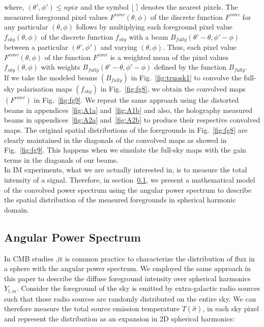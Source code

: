 \documentclass[fleqn,usenatbib]{mnras}
\begin{document}
\noindent where,  $ (\theta', \phi') \leq npix$ and the symbol $\lfloor \, \rceil$ denotes the nearest pixels. The measured foreground pixel values $ F^{conv}(\theta, \phi)$ of the discrete function $ F^{conv}$ for any particular $ (\theta, \phi)$ follows by multiplying each foreground pixel value $f_{sky}(\theta, \phi)$ of the discrete function $f_{sky}$ with a beam  $B_{fully}(\theta' - \theta, \phi' - \phi)$ between a particular $ (\theta', \phi')$ and varying $(\theta, \phi)$. Thus, each pixel value $ F^{conv}(\theta, \phi)$ of the function $ F^{conv}$ is a weighted mean of the pixel values $f_{sky}(\theta, \phi)$ with weights $B_{fully}(\theta' - \theta, \phi' - \phi)$ defined by the function $B_{fully}$.\\

\noindent
If we take the modeled beams $(B_{fully})$ in Fig.~\ref{fig:truosk1} to convolve the full-sky polarisation maps $(f_{sky})$ in Fig.~\ref{fig:fg8}, we obtain the convolved maps  $(F^{conv})$ in Fig.~\ref{fig:fg9}. We repeat the same approach using the distorted beams in appendices~\ref{fig:A1a} and~\ref{fig:A1b} and also, the holography measured beams in appendices~\ref{fig:A2a} and~\ref{fig:A2b} to produce their respective convolved maps. The original spatial distributions of the foregrounds in Fig.~\ref{fig:fg8} are clearly maintained in the diagonals of the convolved maps as showed in Fig.~\ref{fig:fg9}. This happens when we simulate the full-sky maps with the gain terms in the diagonals of our beams.\\

\noindent
In IM experiments, what we are actually interested in, is to measure the total intensity of a signal. Therefore, in section~\ref{sec:spectrum}, we present a mathematical model of the convolved power spectrum using the angular power spectrum to describe the spatial distribution of the measured foregrounds in spherical harmonic domain.


\subsection{Angular Power Spectrum}    \label{sec:spectrum}
In CMB studies \citep{2006NewAR..50..854S,2015arXiv151100532K,1998PhRvD..57.5273W,2015aska.confE..35W,2006ApJ...645L..89S,2016MNRAS.457.1796A},it is common practice to characterize the distribution of flux in a sphere with the angular power spectrum. We employed the same approach in this paper to describe the diffuse foreground intensity over spherical harmonics $Y_{l,m}$. Consider the foreground of the sky is emitted by extra-galactic radio sources such that these radio sources are randomly distributed on the entire sky. We can therefore measure the total source emission temperature $T(\hat{\sigma})$, in each sky pixel and represent the distribution as an expansion in 2D spherical harmonics:
\end{document}
